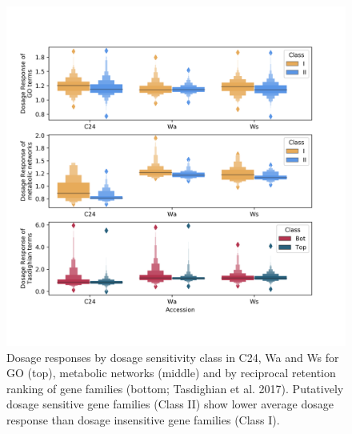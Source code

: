 \documentclass[11pt]{article}
\begin{document}
\begin{figure}[h!]
    \includegraphics[width=\linewidth]{../figures/all_dr_boxen.png}
 \caption{Dosage responses by dosage sensitivity class in C24, Wa and Ws for GO (top), metabolic networks (middle) and by reciprocal retention ranking of gene families (bottom; Tasdighian et al. 2017). Putatively dosage sensitive gene families (Class II) show lower average dosage response than dosage insensitive gene families (Class I).}
  \label{fig4}
\end{figure}
\end{document}
